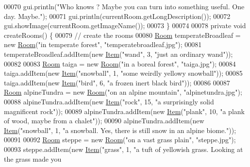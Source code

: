 \begin{DoxyCode}
00070         gui.println(\textcolor{stringliteral}{"Who knows ? Maybe you can turn into something useful. One day. Maybe."});
00071         gui.println(currentRoom.getLongDescription());
00072         gui.showImage(currentRoom.getImageName());
00073     \}
00074 
00078     \textcolor{keyword}{private} \textcolor{keywordtype}{void} createRooms() \{
00079         \textcolor{comment}{// create the rooms}
00080         \hyperlink{classRoom}{Room} temperateBroadleaf = \textcolor{keyword}{new} \hyperlink{classRoom}{Room}(\textcolor{stringliteral}{"in temperate forest"}, \textcolor{stringliteral}{"temperatebroadleaf.jpg"});
00081         temperateBroadleaf.addItem(\textcolor{keyword}{new} \hyperlink{classItem}{Item}(\textcolor{stringliteral}{"wand"}, 3, \textcolor{stringliteral}{"just an ordinary wand"}));
00082 
00083         \hyperlink{classRoom}{Room} taiga = \textcolor{keyword}{new} \hyperlink{classRoom}{Room}(\textcolor{stringliteral}{"in a boreal forest"}, \textcolor{stringliteral}{"taiga.jpg"});
00084         taiga.addItem(\textcolor{keyword}{new} \hyperlink{classItem}{Item}(\textcolor{stringliteral}{"snowball"}, 1, \textcolor{stringliteral}{"some weirdly yellowy snowball"}));
00085         taiga.addItem(\textcolor{keyword}{new} \hyperlink{classItem}{Item}(\textcolor{stringliteral}{"bird"}, 6, \textcolor{stringliteral}{"a frozen inert black bird"}));
00086 
00087         \hyperlink{classRoom}{Room} alpineTundra = \textcolor{keyword}{new} \hyperlink{classRoom}{Room}(\textcolor{stringliteral}{"on an alpine mountain"}, \textcolor{stringliteral}{"alpinetundra.jpg"});
00088         alpineTundra.addItem(\textcolor{keyword}{new} \hyperlink{classItem}{Item}(\textcolor{stringliteral}{"rock"}, 15, \textcolor{stringliteral}{"a surprisingly solid magnificent rock"}));
00089         alpineTundra.addItem(\textcolor{keyword}{new} \hyperlink{classItem}{Item}(\textcolor{stringliteral}{"plank"}, 10, \textcolor{stringliteral}{"a plank of wood, maybe from a chalet"}));
00090         alpineTundra.addItem(\textcolor{keyword}{new} \hyperlink{classItem}{Item}(\textcolor{stringliteral}{"snowball"}, 1, \textcolor{stringliteral}{"a snowball. Yes, there is still snow in an alpine
       biome."}));
00091 
00092         \hyperlink{classRoom}{Room} steppe = \textcolor{keyword}{new} \hyperlink{classRoom}{Room}(\textcolor{stringliteral}{"on a vast grass plain"}, \textcolor{stringliteral}{"steppe.jpg"});
00093         steppe.addItem(\textcolor{keyword}{new} \hyperlink{classItem}{Item}(\textcolor{stringliteral}{"grass"}, 1, \textcolor{stringliteral}{"a tuft of yellowish grass. Looking at the grass made you
}
\end{DoxyCode}

